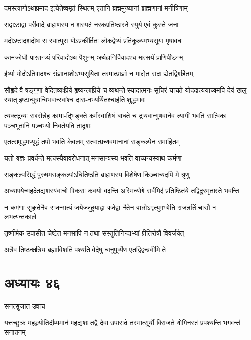 \twolineshloka
{दमस्त्यागोऽथाप्रमाद इत्येतेष्वमृतं स्थितम्}
{एतानि ब्रह्ममुख्यानां ब्राह्मणानां मनीषिणाम्}


\twolineshloka
{सद्वाऽसद्वा परीवादे ब्राह्मणस्य न शस्यते}
{नरकप्रतिष्ठास्ते स्युर्य एवं कुरुते जनाः}


\twolineshloka
{मदोऽष्टादशदोषः स स्यात्पुरा योऽप्रकीर्तितः}
{लोकद्वेष्यं प्रतिकूल्यमभ्यसूया मृषावचः}


\twolineshloka
{कामक्रोधौ पारतन्त्र्यं परिवादोऽथ पैशुनम्}
{अर्थहानिर्विवादश्च मात्सर्यं प्राणिपीडनम्}


\twolineshloka
{ईर्ष्या मोदोऽतिवादश्च संज्ञानाशोऽभ्यसूयिता}
{तस्मात्प्राज्ञो न माद्येत सदा ह्येतद्विगर्हितम्}


\threelineshloka
{सौहृदे वै षङ्गुणा वेदितव्यःप्रिये हृष्यन्त्यप्रिये च व्यथन्ते}
{स्यादात्मनः सुचिरं याचते योददात्ययाच्यमपि देयं खलु स्यात्}
{इष्टान्पुत्रान्विभवान्स्वांश्च दारा-नभ्यर्थितश्चार्हति शुद्धभावः}


त्यक्तद्रव्यः संवसेन्नेह कामा-द्भिङ्क्ते कर्मस्वाशिषं बाधते च
\twolineshloka
{द्रव्यवान्गुणवानेवं त्यागी भवति सात्विकः}
{पञ्चभूतानि पञ्चभ्यो निवर्तयति तादृशः}


\twolineshloka
{एतत्समृद्धमप्यृद्धं तपो भवति केवलम्}
{सत्वात्प्रच्यवमानानां सङ्कल्पेन समाहितम्}


\twolineshloka
{यतो यज्ञः प्रवर्धन्ते मत्यस्यैवावरोधनात्}
{मनसान्यस्य भवति वाच्यन्यस्याथ कर्मणा}


\twolineshloka
{सङ्कल्पसिद्धं पुरुषमसङ्कल्पोऽधितिष्ठति}
{ब्राह्मणस्य विशेषेण किञ्चान्यदपि मे श्रृणु}


\twolineshloka
{अध्यापयेन्महदेतद्यशस्यंवाचो विकराः कवयो वदन्ति}
{अस्मिन्योगे सर्वमिदं प्रतिष्ठितंये तद्विदुरमृतास्ते भवन्ति}


\twolineshloka
{न कर्मणा सुकृतेनैव राजन्सत्यं जयेज्जुहुयाद्वा यजेद्वा}
{नैतेन वालोऽमृत्युमभ्येति राजन्रतिं चासौ न लभत्यन्तकाले}


\twolineshloka
{तृष्णीमेक उपासीत चेष्टेत मनसापि न}
{तथा संस्तुतिनिन्दाभ्यां प्रीतिरोषौ विवर्जयेत्}


\twolineshloka
{अत्रैव तिष्ठन्क्षत्रिय ब्रह्माविशति पश्यति}
{वेदेषु चानुपूर्व्येण एतद्विद्वन्ब्रवीमि ते}


\chapter{अध्यायः ४६}
\twolineshloka
{सनत्सुजात उवाच}
{}


\threelineshloka
{यत्तच्छुक्रं महञ्ज्योतिर्दीप्यमानं महद्यशः}
{तद्वै देवा उपासते तस्मात्सूर्यो विराजते}
{योगिनस्तं प्रपश्यन्ति भगवन्तं सनातनम्}


